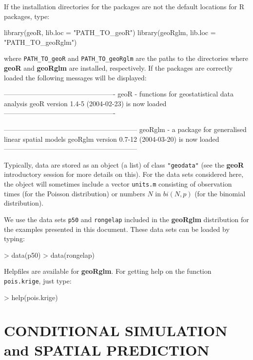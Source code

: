 \documentclass[12pt,a4paper]{article}
\newcommand{\strong}[1]{{\textbf{ #1}}}
\let\pkg=\strong
\newcommand{\code}[1]{\texttt{\small #1}}
\newcommand{\R}{{\textsf{R}}{}}
\let\command=\code
\begin{document}
If the installation directories for the packages are not the default locations for \R{} packages, type:
\begin{Rin}
  library(geoR, lib.loc = "PATH_TO_geoR")
  library(geoRglm, lib.loc = "PATH_TO_geoRglm")
\end{Rin}
where \verb+PATH_TO_geoR+ and \verb+PATH_TO_geoRglm+ are the paths to the directories where \pkg{geoR} and \pkg{geoRglm} are installed, respectively.
If the packages are correctly loaded the following messages will be displayed:
\begin{Schunk}
\begin{Soutput}
-------------------------------------------------
geoR - functions for geostatistical data analysis
geoR version 1.4-5 (2004-02-23) is now loaded
-------------------------------------------------
\end{Soutput}
\begin{Soutput}
-----------------------------------------------------------
geoRglm - a package for generalised linear spatial models
geoRglm version 0.7-12 (2004-03-20) is now loaded
-----------------------------------------------------------
\end{Soutput}
\end{Schunk}

Typically, data are stored as an object (a list) of class \code{"geodata"} (see the \pkg{geoR} introductory session 
for more details on this). For the data sets considered here, the object will sometimes include a vector \code{units.m} consisting 
of observation times (for the Poisson distribution) or numbers $N$ in $bi(N,p)$ (for the binomial distribution).

We use the data sets  \code{p50} and \code{rongelap} included in the \pkg{geoRglm} distribution for 
the examples presented in this document. These data sets can be loaded by typing:
\begin{Schunk}
\begin{Sinput}
> data(p50)
> data(rongelap)
\end{Sinput}
\end{Schunk}
Helpfiles are available for \pkg{geoRglm}. For getting help on the function \command{pois.krige}, just type:  
\begin{Rin}
> help(pois.krige)
\end{Rin}

\section{CONDITIONAL SIMULATION and SPATIAL PREDICTION}
\end{document}
